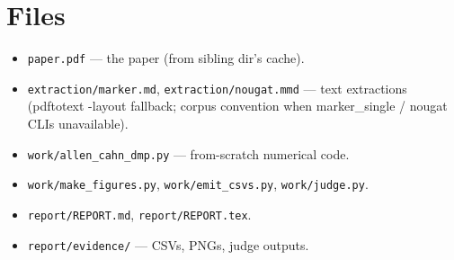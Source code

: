 \documentclass[11pt]{article}
\begin{document}
\section{Files}

\begin{itemize}
  \item \texttt{paper.pdf} --- the paper (from sibling dir's cache).
  \item \texttt{extraction/marker.md}, \texttt{extraction/nougat.mmd} ---
    text extractions (pdftotext -layout fallback; corpus convention when
    marker\_single / nougat CLIs unavailable).
  \item \texttt{work/allen\_cahn\_dmp.py} --- from-scratch numerical code.
  \item \texttt{work/make\_figures.py}, \texttt{work/emit\_csvs.py},
    \texttt{work/judge.py}.
  \item \texttt{report/REPORT.md}, \texttt{report/REPORT.tex}.
  \item \texttt{report/evidence/} --- CSVs, PNGs, judge outputs.
\end{itemize}
\end{document}
